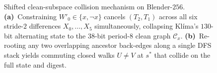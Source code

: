 \documentclass[11pt,a4paper]{article}
\theoremstyle{definition}
\theoremstyle{remark}
\newcommand{\SumAcc}{\mathsf{Sum}}
\begin{document}
\begin{figure}[t!]
\caption{Shifted clean-subspace collision mechanism on Blender-$256$. \textbf{(a)}~Constraining $W'_0 \in \{x, \neg x\}$ cancels $(T_2, T_1)$ across all six stride-$2$ differences $X_0, \dots, X_5$ simultaneously, collapsing Kl\'{i}ma's $130$-bit alternating state to the $38$-bit period-$8$ clean graph $\mathcal{C}_x$. \textbf{(b)}~Re-rooting any two overlapping ancestor back-edges along a single DFS stack yields commuting closed walks $U \neq V$ at $s^*$ that collide on the full state and digest.}
\label{fig:route1-subspace}
\end{figure}
\end{document}
